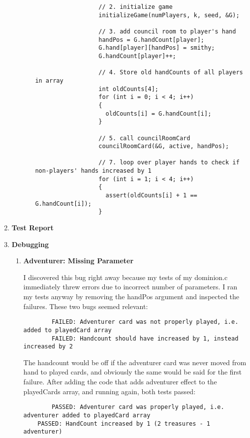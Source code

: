\documentclass[11pt,letterpaper]{article}
\begin{document}
\begin{enumerate}[label=\Roman*.]
\begin{itemize}[label=]
\begin{itemize}[label=]
\begin{lstlisting}
                  // 2. initialize game
                  initializeGame(numPlayers, k, seed, &G);

                  // 3. add council room to player's hand
                  handPos = G.handCount[player];
                  G.hand[player][handPos] = smithy;
                  G.handCount[player]++;

                  // 4. Store old handCounts of all players in array
                  int oldCounts[4];
                  for (int i = 0; i < 4; i++) 
                  {
                    oldCounts[i] = G.handCount[i];
                  }

                  // 5. call councilRoomCard
                  councilRoomCard(&G, active, handPos);

                  // 7. loop over player hands to check if non-players' hands increased by 1
                  for (int i = 1; i < 4; i++) 
                  {
                    assert(oldCounts[i] + 1 == G.handCount[i]);
                  }
                \end{lstlisting}
        \end{itemize}
    \end{itemize}

  \item \textbf{Test Report}
  \item \textbf{Debugging}
    \begin{enumerate}[label=]
      \item \textbf{Adventurer: Missing Parameter}

        I discovered this bug right away because my tests of my dominion.c
        immediately threw errors due to incorrect number of parameters. I
        ran my tests anyway by removing the handPos argument and inspected the failures. These two
        bugs seemed relevant: 
        \begin{lstlisting}
        FAILED: Adventurer card was not properly played, i.e. added to playedCard array
        FAILED: Handcount should have increased by 1, instead increased by 2
        \end{lstlisting}
        The handcount would be off if the adventurer card was never moved from hand
        to played cards, and obviously the same would be said for the first failure.
        After adding the code that adds adventurer effect to the 
        playedCards array, and running again, both tests passed:
        \begin{lstlisting}
        PASSED: Adventurer card was properly played, i.e. adventurer added to playedCard array
	PASSED: HandCount increased by 1 (2 treasures - 1 adventurer)
        \end{lstlisting}
        

\end{enumerate}
\end{enumerate}
\end{document}
